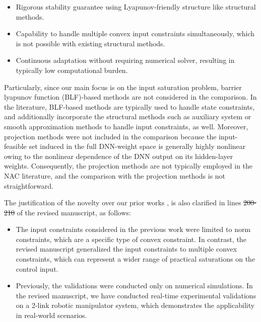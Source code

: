 \documentclass[12pt,english]{reviewresponse}
\makeatletter
\providecommand{\DIFaddtex}[1]{{\protect\color{blue}\uwave{#1}}} %
\providecommand{\DIFdeltex}[1]{{\protect\color{red}\sout{#1}}} %
\providecommand{\DIFaddbegin}{} %
\providecommand{\DIFaddend}{} %
\providecommand{\DIFdelbegin}{} %
\providecommand{\DIFdelend}{} %
\providecommand{\DIFadd}[1]{\texorpdfstring{\DIFaddtex{#1}}{#1}} %
\providecommand{\DIFdel}[1]{\texorpdfstring{\DIFdeltex{#1}}{}} %
\providecommand{\DIFscaledelfig}{0.5}
\newlength{\DIFdelgraphicswidth} %
\newlength{\DIFdelgraphicsheight} %
\providecommand{\DIFaddincludegraphics}[2][]{{\color{blue}\fbox{\DIFOincludegraphics[#1]{#2}}}} %
\providecommand{\DIFdelincludegraphics}[2][]{%
\sbox{\DIFdelgraphicsbox}{\DIFOincludegraphics[#1]{#2}}%
\settoboxwidth{\DIFdelgraphicswidth}{\DIFdelgraphicsbox} %
\settoboxtotalheight{\DIFdelgraphicsheight}{\DIFdelgraphicsbox} %
\scalebox{\DIFscaledelfig}{%
\parbox[b]{\DIFdelgraphicswidth}{\usebox{\DIFdelgraphicsbox}\\[-\baselineskip] \rule{\DIFdelgraphicswidth}{0em}}\llap{\resizebox{\DIFdelgraphicswidth}{\DIFdelgraphicsheight}{%
\setlength{\unitlength}{\DIFdelgraphicswidth}%
\begin{picture}(1,1)%
\thicklines\linethickness{2pt} %
{\color[rgb]{1,0,0}\put(0,0){\framebox(1,1){}}}%
{\color[rgb]{1,0,0}\put(0,0){\line( 1,1){1}}}%
{\color[rgb]{1,0,0}\put(0,1){\line(1,-1){1}}}%
\end{picture}%
}\hspace*{3pt}}} %
} %
\DeclareRobustCommand{\DIFaddbegin}{\DIFOaddbegin \let\includegraphics\DIFaddincludegraphics} %
\DeclareRobustCommand{\DIFaddend}{\DIFOaddend \let\includegraphics\DIFOincludegraphics} %
\DeclareRobustCommand{\DIFdelbegin}{\DIFOdelbegin \let\includegraphics\DIFdelincludegraphics} %
\DeclareRobustCommand{\DIFdelend}{\DIFOaddend \let\includegraphics\DIFOincludegraphics} %
\let\sout@orig\sout %
\renewcommand{\sout}[1]{\ifmmode\text{\sout@orig{\ensuremath{#1}}}\else\sout@orig{#1}\fi} %
\makeatother
\begin{document}
\begin{revresponse}
\begin{itemize}
    \item 
      Rigorous stability guarantee using Lyapunov-friendly structure like structural methods.

    \item 
      Capability to handle multiple convex input constraints simultaneously, which is not possible with existing structural methods.

    \item 
      Continuous adaptation without requiring numerical solver, resulting in typically low computational burden.

  \end{itemize}

  \bigskip

  Particularly, since our main focus is on the input saturation problem, barrier lyapunov function (BLF)-based methods are not considered in the comparison.
  In the literature, BLF-based methods are typically used to handle state constraints, and additionally incorporate the structural methods such as auxiliary system or smooth approximation methods to handle input constraints, as well.
  Moreover, projection methods were not included in the comparison because the input-feasible set induced in the full DNN-weight space is generally highly nonlinear owing to the nonlinear dependence of the DNN output on its hidden-layer weights.
  Consequently, the projection methods are not typically employed in the NAC literature, and the comparison with the projection methods is not straightforward.

  \bigskip

  The justification of the novelty over our prior works \cite{Ryu:2025aa}, \cite{Ryu:2025ab} is also clarified in lines \DIFdelbegin \DIFdel{200-210 }\DIFdelend \DIFaddbegin \DIFadd{212--222 }\DIFaddend of the revised manuscript, as follows:
  \begin{itemize}
    \item 
      The input constraints considered in the previous work \cite{Ryu:2025aa} were limited to norm constraints, which are a specific type of convex constraint.
      In contrast, the revised manuscript generalized the input constraints to multiple convex constraints, which can represent a wider range of practical saturations on the control input.

    \item 
      Previously, the validations were conducted only on numerical simulations.
      In the revised manuscript, we have conducted real-time experimental validations on a 2-link robotic manipulator system, which demonstrates the applicability in real-world scenarios.


\end{itemize}
\end{revresponse}
\end{document}
